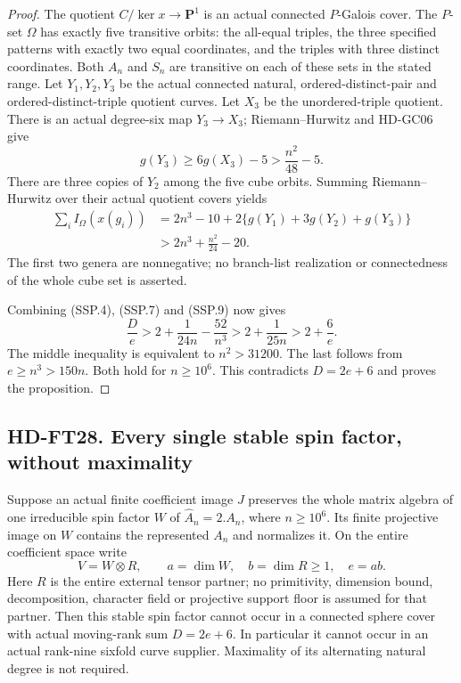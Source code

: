 \begin{proof}
The quotient $C/\ker x\longrightarrow\mathbf P^1$ is an actual
connected $P$-Galois cover.  The $P$-set $\Omega$ has exactly
five transitive orbits: the all-equal triples, the three specified
patterns with exactly two equal coordinates, and the triples with
three distinct coordinates.  Both $A_n$ and $S_n$ are transitive
on each of these sets in the stated range.  Let $Y_1,Y_2,Y_3$
be the actual connected natural, ordered-distinct-pair and
ordered-distinct-triple quotient curves.  Let $X_3$ be the
unordered-triple quotient.  There is an actual degree-six map
$Y_3\longrightarrow X_3$; Riemann--Hurwitz and HD-GC06 give
\[
 g(Y_3)\ge6g(X_3)-5>\frac{n^2}{48}-5.
 \tag{SSP.8}
\]
There are three copies of $Y_2$ among the five cube orbits.
Summing Riemann--Hurwitz over their actual quotient covers yields
\[
 \begin{split}
 \sum_i I_\Omega(x(g_i))
 &=2n^3-10+2\{g(Y_1)+3g(Y_2)+g(Y_3)\}\\
 &>2n^3+\frac{n^2}{24}-20.
 \end{split}
 \tag{SSP.9}
\]
The first two genera are nonnegative; no branch-list realization
or connectedness of the whole cube set is asserted.

Combining (SSP.4), (SSP.7) and (SSP.9) now gives
\[
 \frac De>2+\frac1{24n}-\frac{52}{n^3}
          >2+\frac1{25n}>2+\frac6e.
 \tag{SSP.10}
\]
The middle inequality is equivalent to $n^2>31200$.
The last follows from $e\ge n^3>150n$.  Both hold for
$n\ge10^6$.  This contradicts $D=2e+6$ and proves the proposition.
\end{proof}

\subsection*{HD-FT28. Every single stable spin factor, without maximality}

\begin{theorem}[HD-FT28]
Suppose an actual finite coefficient image $J$ preserves the
whole matrix algebra of one irreducible spin factor $W$ of
$\widehat A_n=2.A_n$, where $n\ge10^6$.  Its finite projective
image on $W$ contains the represented $A_n$ and normalizes it.
On the entire coefficient space write
\[
                    V=W\otimes R,\qquad
 a=\dim W,\quad b=\dim R\ge1,\quad e=ab.
 \tag{SSP.11}
\]
Here $R$ is the entire external tensor partner; no primitivity,
dimension bound, decomposition, character field or projective
support floor is assumed for that partner.  Then this stable
spin factor cannot occur in a connected sphere cover with actual
moving-rank sum $D=2e+6$.  In particular it cannot occur in an
actual rank-nine sixfold curve supplier.  Maximality of its
alternating natural degree is not required.
\end{theorem}

